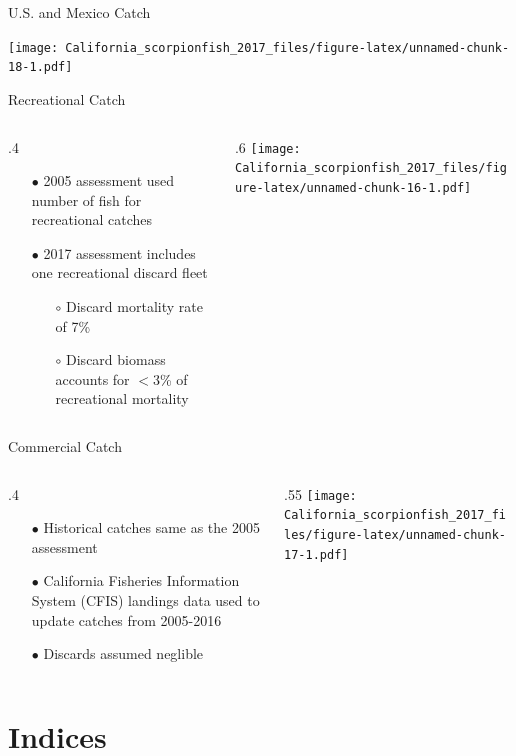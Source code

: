 \documentclass[ignorenonframetext,]{beamer}
\def\begincols{\begin{columns}}
\def\begincol{\begin{column}}
\def\endcol{\end{column}}
\def\endcols{\end{columns}}
\begin{document}
\begin{frame}{U.S. and Mexico Catch}

\texttt{[image: California\_scorpionfish\_2017\_files/figure-latex/unnamed-chunk-18-1.pdf]}

\end{frame}

\begin{frame}{Recreational Catch}

\begincols
 \begincol{.4\textwidth}

\begin{itemize}
\item[$\bullet$] 2005 assessment used number of fish for recreational catches
\item[$\bullet$] 2017 assessment includes one recreational discard fleet
\begin{itemize}
\item[$\circ$] Discard mortality rate of 7\%
\item[$\circ$] Discard biomass accounts for  $<$3\% of recreational mortality
\end{itemize}
\end{itemize}

\endcol
 \begincol{.6\textwidth}
\texttt{[image: California\_scorpionfish\_2017\_files/figure-latex/unnamed-chunk-16-1.pdf]}\\
\endcol
\endcols

\end{frame}

\begin{frame}{Commercial Catch}

\begincols
 \begincol{.4\textwidth}

\begin{itemize}
  \item[$\bullet$] Historical catches same as the 2005 assessment
  \item[$\bullet$] California Fisheries Information System (CFIS) landings data used to update catches from 2005-2016 
  \item[$\bullet$] Discards assumed neglible
\end{itemize}

\endcol
 \begincol{.55\textwidth}
\texttt{[image: California\_scorpionfish\_2017\_files/figure-latex/unnamed-chunk-17-1.pdf]}
\endcol
\endcols

\end{frame}

\section{Indices}\label{indices}
\end{document}
